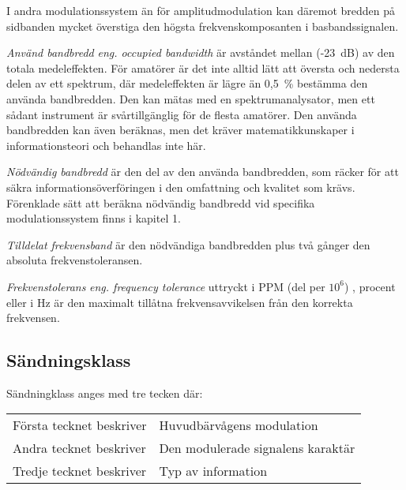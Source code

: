 I andra modulationssystem än för amplitudmodulation kan däremot bredden på
sidbanden mycket överstiga den högsta frekvenskomposanten i basbandssignalen.

\emph{Använd bandbredd} \emph{eng. occupied bandwidth} är avståndet mellan
(-23~dB) av den totala medeleffekten. För amatörer är det inte alltid lätt att
översta och nedersta delen av ett spektrum, där medeleffekten är lägre än 0,5~\%
bestämma den använda bandbredden. Den kan mätas med en spektrumanalysator, men
ett sådant instrument är svårtillgänglig för de flesta amatörer. Den använda
bandbredden kan även beräknas, men det kräver matematikkunskaper i
informationsteori och behandlas inte här.

\emph{Nödvändig bandbredd} är den del av den använda bandbredden, som räcker
för att säkra informationsöverföringen i den omfattning och kvalitet som krävs.
Förenklade sätt att beräkna nödvändig bandbredd vid specifika modulationssystem
finns i kapitel 1.

\emph{Tilldelat frekvensband} är den nödvändiga bandbredden plus två gånger den
absoluta frekvenstoleransen.

\emph{Frekvenstolerans} \emph{eng. frequency tolerance} uttryckt i PPM (del per
\(10^6\)) , procent eller i Hz är den maximalt tillåtna frekvensavvikelsen från
den korrekta frekvensen.

\subsection{Sändningsklass}
Sändningklass anges med tre tecken där:\\
\begin{tabular}{ll}
	Första tecknet beskriver &  Huvudbärvågens modulation \\
	Andra tecknet beskriver & Den modulerade signalens karaktär \\
	Tredje tecknet beskriver & Typ av information \\
\end{tabular}

